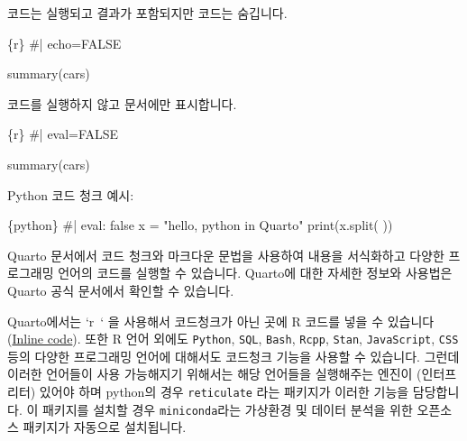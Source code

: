 \documentclass[
  a4paper,
]{book}
\newenvironment{Shaded}{\begin{snugshade}}{\end{snugshade}}
\newcommand{\BuiltInTok}[1]{\textcolor[rgb]{0.00,0.23,0.31}{#1}}
\newcommand{\CommentTok}[1]{\textcolor[rgb]{0.37,0.37,0.37}{#1}}
\newcommand{\FunctionTok}[1]{\textcolor[rgb]{0.28,0.35,0.67}{#1}}
\newcommand{\InformationTok}[1]{\textcolor[rgb]{0.37,0.37,0.37}{#1}}
\newcommand{\NormalTok}[1]{\textcolor[rgb]{0.00,0.23,0.31}{#1}}
\newcommand{\OperatorTok}[1]{\textcolor[rgb]{0.37,0.37,0.37}{#1}}
\newcommand{\StringTok}[1]{\textcolor[rgb]{0.13,0.47,0.30}{#1}}
\begin{document}
코드는 실행되고 결과가 포함되지만 코드는 숨깁니다.

\begin{Shaded}
\begin{Highlighting}[]
\InformationTok{\textasciigrave{}\textasciigrave{}\textasciigrave{}\{r\}}
\CommentTok{\#| echo=FALSE}

\FunctionTok{summary}\NormalTok{(cars)}
\InformationTok{\textasciigrave{}\textasciigrave{}\textasciigrave{}}
\end{Highlighting}
\end{Shaded}

코드를 실행하지 않고 문서에만 표시합니다.

\begin{Shaded}
\begin{Highlighting}[]
\InformationTok{\textasciigrave{}\textasciigrave{}\textasciigrave{}\{r\}}
\CommentTok{\#| eval=FALSE}

\FunctionTok{summary}\NormalTok{(cars)}
\InformationTok{\textasciigrave{}\textasciigrave{}\textasciigrave{}}
\end{Highlighting}
\end{Shaded}

Python 코드 청크 예시:

\begin{Shaded}
\begin{Highlighting}[]
\InformationTok{\textasciigrave{}\textasciigrave{}\textasciigrave{}\{python\}}
\CommentTok{\#| eval: false}
\NormalTok{x }\OperatorTok{=} \StringTok{"hello, python in Quarto"}
\BuiltInTok{print}\NormalTok{(x.split(}\StringTok{\textquotesingle{} \textquotesingle{}}\NormalTok{))}
\InformationTok{\textasciigrave{}\textasciigrave{}\textasciigrave{}}
\end{Highlighting}
\end{Shaded}

Quarto 문서에서 코드 청크와 마크다운 문법을 사용하여 내용을 서식화하고
다양한 프로그래밍 언어의 코드를 실행할 수 있습니다. Quarto에 대한 자세한
정보와 사용법은 Quarto 공식 문서에서 확인할 수 있습니다.

Quarto에서는 `r~` 을 사용해서 코드청크가 아닌 곳에 R 코드를 넣을 수
있습니다
(\href{https://quarto.org/docs/get-started/computations/rstudio.html\#inline-code}{Inline
code}). 또한 R 언어 외에도 \texttt{Python}, \texttt{SQL}, \texttt{Bash},
\texttt{Rcpp}, \texttt{Stan}, \texttt{JavaScript}, \texttt{CSS} 등의
다양한 프로그래밍 언어에 대해서도 코드청크 기능을 사용할 수 있습니다.
그런데 이러한 언어들이 사용 가능해지기 위해서는 해당 언어들을 실행해주는
엔진이 (인터프리터) 있어야 하며 python의 경우 \texttt{reticulate} 라는
패키지가 이러한 기능을 담당합니다. 이 패키지를 설치할 경우
\texttt{miniconda}라는 가상환경 및 데이터 분석을 위한 오픈소스 패키지가
자동으로 설치됩니다.
\end{document}

